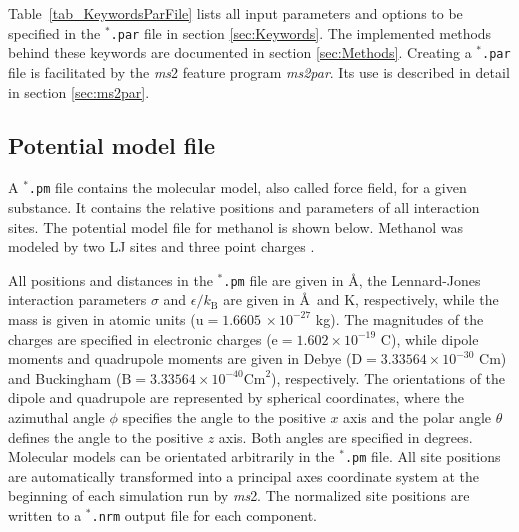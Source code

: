 Table~\ref{tab_KeywordsParFile} lists all input parameters and options to be specified in the \texttt{$^{*}$\hspace{-3pt}.par} file in section \ref{sec:Keywords}. The implemented methods behind these keywords are documented in section \ref{sec:Methods}. Creating a \texttt{$^{*}$\hspace{-3pt}.par} file is facilitated by the \textit{ms}2 feature program \textit{ms2}\textit{par}. Its use is described in detail in section \ref{sec:ms2par}.



\subsection{Potential model file}
\label{sec:pm - file}

A \texttt{$^{*}$\hspace{-3pt}.pm} file contains the molecular model, also called force field, for a given substance. It contains the relative positions and parameters of all interaction sites. The potential model file for methanol is shown below. Methanol was modeled by two LJ sites and three point charges \parencite{Schnabel2007_A}. 

All positions and distances in the \texttt{$^{*}$\hspace{-3pt}.pm} file are given in \AA, the Lennard-Jones interaction parameters $\sigma$ and $\epsilon / k_{\text{B}}$ are given in \AA~and K, respectively, while the mass is given in atomic units (u$ = 1.6605\,\times 10^{-27}$ kg). The magnitudes of the charges are specified in electronic charges (e$ = 1.602 \times 10^{-19}$ C), while dipole moments and quadrupole moments are given in Debye ($\text{D} = 3.33564 \times 10^{-30}$ Cm) and Buckingham ($\text{B} = 3.33564 \times 10^{-40} \text{Cm}^{2}$), respectively. The orientations of the dipole and quadrupole are represented by spherical coordinates, where the azimuthal angle $\phi$ specifies the angle to the positive $x$ axis and the polar angle $\theta$ defines the angle to the positive $z$ axis. Both angles are specified in degrees. Molecular models can be orientated arbitrarily in the \texttt{$^{*}$\hspace{-3pt}.pm} file. All site positions are automatically transformed into a principal axes coordinate system at the beginning of each simulation run by \textit{ms}2. The normalized site positions are written to a \texttt{$^{*}$\hspace{-3pt}.nrm} output file for each component.


